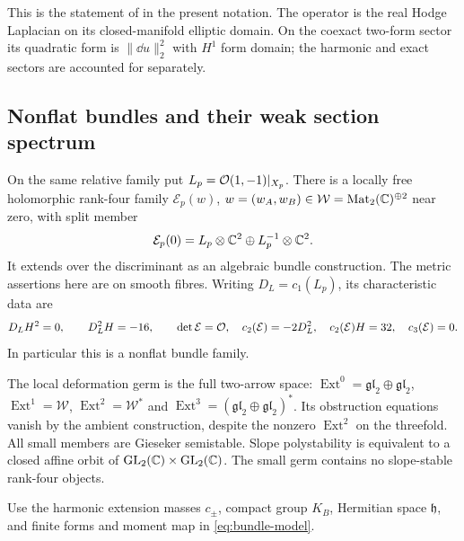 This is the statement of \cite[Theorem~1.1 and Section~12]{W_Hodge}
in the present notation. The operator is the real Hodge Laplacian
on its closed-manifold elliptic domain. On the coexact two-form
sector its quadratic form is $\|\dd u\|_2^2$ with $H^1$ form
domain; the harmonic and exact sectors are accounted for separately.

\subsection{Nonflat bundles and their weak section spectrum}

On the same relative family put $L_p=\mathcal O(1,-1)|_{X_p}$.
There is a locally free holomorphic rank-four family
$\mathcal E_p(w)$, $w=(w_A,w_B)\in
\mathcal W=\operatorname{Mat}_2(\mathbb C)^{\oplus2}$ near zero,
with split member
\[
 \mathcal E_p(0)=L_p\otimes\mathbb C^2\oplus L_p^{-1}\otimes\mathbb C^2.
\]
It extends over the discriminant as an algebraic bundle
construction. The metric assertions here are on smooth fibres.
Writing $D_L=c_1(L_p)$, its characteristic data are
\begin{equation}\label{eq:nonflat-characteristic-data}
 D_LH^2=0,\qquad D_L^2H=-16,\qquad
 \det\mathcal E=\mathcal O,\quad c_2(\mathcal E)=-2D_L^2,\quad
 c_2(\mathcal E)H=32,\quad c_3(\mathcal E)=0.
\end{equation}
In particular this is a nonflat bundle family.

The local deformation germ is the full two-arrow space:
$\operatorname{Ext}^0=\mathfrak{gl}_2\oplus\mathfrak{gl}_2$,
$\operatorname{Ext}^1=\mathcal W$,
$\operatorname{Ext}^2=\mathcal W^*$ and
$\operatorname{Ext}^3=(\mathfrak{gl}_2\oplus\mathfrak{gl}_2)^*$.
Its obstruction equations vanish by the ambient construction,
despite the nonzero $\operatorname{Ext}^2$ on the threefold.
All small members are Gieseker semistable. Slope polystability
is equivalent to a closed affine orbit of
$\operatorname{GL}_2(\mathbb C)\times\operatorname{GL}_2(\mathbb C)$.
The small germ contains no slope-stable rank-four objects.

Use the harmonic extension masses $c_\pm$, compact group $K_B$,
Hermitian space $\mathfrak h$, and finite forms and moment map
in \eqref{eq:bundle-model}.

